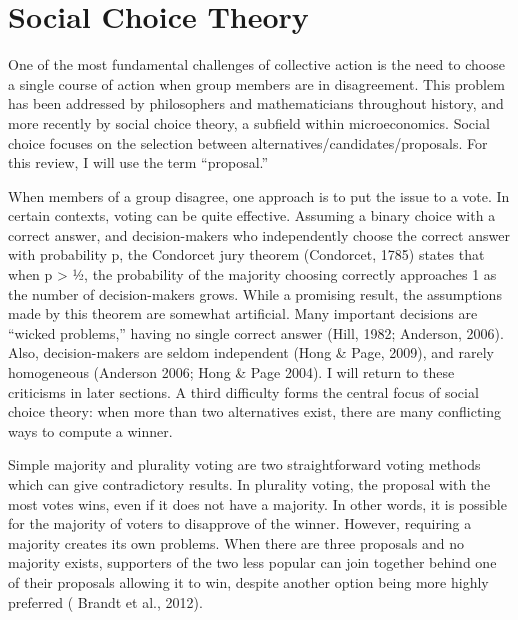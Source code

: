 \section{Social Choice Theory}
One of the most fundamental challenges of collective action is the need to choose a single course of action when group members are in disagreement. This problem has been addressed by philosophers and mathematicians throughout history, and more recently by social choice theory, a subfield within microeconomics. Social choice focuses on the selection between alternatives/candidates/proposals. For this review, I will use the term ``proposal.''

When members of a group disagree, one approach is to put the issue to a vote. In certain contexts, voting can be quite effective. Assuming a binary choice with a correct answer, and decision-makers who independently choose the correct answer with probability p, the Condorcet jury theorem (Condorcet, 1785) states that when p > ½, the probability of the majority choosing correctly approaches 1 as the number of decision-makers grows. While a promising result, the assumptions made by this theorem are somewhat artificial. Many important decisions are ``wicked problems,'' having no single correct answer (Hill, 1982; Anderson, 2006). Also, decision-makers are seldom independent (Hong \& Page, 2009), and rarely homogeneous (Anderson 2006; Hong \& Page 2004). I will return to these criticisms in later sections. A third difficulty forms the central focus of social choice theory: when more than two alternatives exist, there are many conflicting ways to compute a winner.

Simple majority and plurality voting are two straightforward voting methods which can give contradictory results. In plurality voting, the proposal with the most votes wins, even if it does not have a majority. In other words, it is possible for the majority of voters to disapprove of the winner. However, requiring a majority creates its own problems. When there are three proposals and no majority exists, supporters of the two less popular can join together behind one of their proposals allowing it to win, despite another option being more highly preferred ( Brandt et al., 2012).

